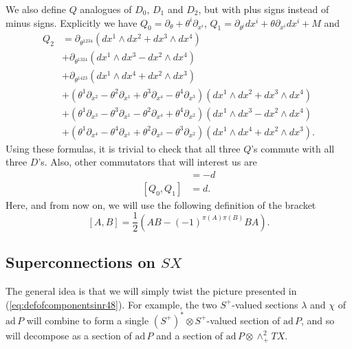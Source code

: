 \documentclass[twoside]{amsart}
\newcommand{\mytexorpdfstring}[2]{\texorpdfstring{#1}{#2}}
\renewcommand{\eqref}[1]{(\ref{eq:#1})}
\newcommand{\enm}[1]{\ensuremath{#1}}
\newcommand{\ad}{\enm{\mathrm{ad}}}
\newcommand{\spl}{\enm{S^{+}}}
\newcommand{\spd}{\enm{(\spl)^{*}}}
\newcommand{\adp}{\enm{\ad\,P}}
\begin{document}
We also define \( Q \) analogues of \( D_0 \), \( D_1 \) and \( D_2
\), but with plus signs instead of minus signs. Explicitly we have
\( Q_{0} = \partial_{\theta} + \theta^{i}\partial_{x^{i}}
\),
\( Q_{1} = \partial_{\theta^{i}}dx^{i} + \theta\partial_{x^{i}}
dx^{i} + M \) and
\begin{align*}
    Q_{2} & = \partial_{\theta^{1234}}
    (dx^{1}\wedge dx^{2}+dx^{3}\wedge dx^{4}) \\
    & + \partial_{\theta^{1324}}
    (dx^{1}\wedge dx^{3}-dx^{2}\wedge dx^{4}) \\
    & + \partial_{\theta^{1423}}
    (dx^{1}\wedge dx^{4}+dx^{2}\wedge dx^{3}) \\
    & + (\theta^{1}\partial_{x^{2}} - \theta^{2}\partial_{x^{1}}
    +\theta^{3}\partial_{x^{4}} - \theta^{4}\partial_{x^{3}})
    (dx^{1}\wedge dx^{2}+dx^{3}\wedge dx^{4}) \\
    & + (\theta^{1}\partial_{x^{3}} - \theta^{3}\partial_{x^{1}}
    -\theta^{2}\partial_{x^{4}} + \theta^{4}\partial_{x^{2}})
    (dx^{1}\wedge dx^{3}-dx^{2}\wedge dx^{4}) \\
    & + (\theta^{1}\partial_{x^{4}} - \theta^{4}\partial_{x^{1}}
    +\theta^{2}\partial_{x^{3}} - \theta^{3}\partial_{x^{2}})
    (dx^{1}\wedge dx^{4}+dx^{2}\wedge dx^{3}).
\end{align*}
Using these formulas, it is trivial to check that all three \( Q \)'s
commute with all three \( D \)'s.  Also, other commutators that
will interest us are
\begin{align}
[D_0, D_1] &= -d \\
[Q_0,Q_1]  &= d.
\end{align}
Here, and from now on, we will use the following definition of the
bracket
\begin{equation}
\label{eq:newbracket}
[A,B] = \frac{1}{2}(AB - (-1)^{\pi(A)\pi(B)}BA).
\end{equation}

\subsection{Superconnections on \mytexorpdfstring{$SX$}{SX}}

The general idea is that we will simply twist the picture presented
in
\eqref{defofcomponentsinr48}.  For
example, the two \spl-valued sections \( \lambda \) and \( \chi \) of
\( \adp \) will combine to form a single \(
\spd\otimes\spl \)-valued section of \( \adp \), and so will
decompose as a section of \( \adp \) and a section of \( \ad\,
P\otimes\wedge^{2}_{+}TX \).
\end{document}
